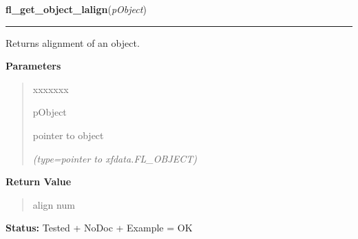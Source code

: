 \hspace{.8\funcindent}\begin{boxedminipage}{\funcwidth}

    \raggedright \textbf{fl\_get\_object\_lalign}(\textit{pObject})

    \vspace{-1.5ex}

    \rule{\textwidth}{0.5\fboxrule}
\setlength{\parskip}{2ex}
    Returns alignment of an object.

\setlength{\parskip}{1ex}
      \textbf{Parameters}
      \vspace{-1ex}

      \begin{quote}
        \begin{Ventry}{xxxxxxx}

          \item[pObject]

          pointer to object

            {\it (type=pointer to xfdata.FL\_OBJECT)}

        \end{Ventry}

      \end{quote}

      \textbf{Return Value}
    \vspace{-1ex}

      \begin{quote}
      align num

      \end{quote}

\textbf{Status:} Tested + NoDoc + Example = OK



    \end{boxedminipage}

    \label{xformslib:library:fl_set_object_lalign}

    \vspace{0.5ex}

